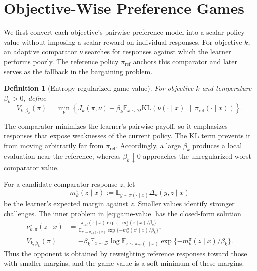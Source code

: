 \documentclass{article}
\newtheorem{definition}{Definition}
\theoremstyle{remark}
\theoremstyle{plain}
\newcommand{\KL}{\mathrm{KL}}
\newcommand{\E}{\mathbb{E}}
\newcommand{\D}{\mathcal{D}}
\newcommand{\piref}{\pi_{\mathrm{ref}}}
\begin{document}
\section{Objective-Wise Preference Games}
\label{sec:game-utility}
We first convert each objective's pairwise preference model into a scalar policy value without imposing a scalar reward on individual responses. For objective $k$, an adaptive comparator $\nu$ searches for responses against which the learner performs poorly. The reference policy $\piref$ anchors this comparator and later serves as the fallback in the bargaining problem.

\begin{definition}[Entropy-regularized game value]
\label{def:game-value}
For objective $k$ and temperature $\beta_k>0$, define
\begin{equation}
V_{k,\beta_k}(\pi)
=
\min_{\nu}
\left\{
J_k(\pi,\nu)
+
\beta_k\E_{x\sim\D}
\KL\!\left(\nu(\cdot\mid x)\,\|\,\piref(\cdot\mid x)\right)
\right\}.
\label{eq:game-value}
\end{equation}
\end{definition}
The comparator minimizes the learner's pairwise payoff, so it emphasizes responses that expose weaknesses of the current policy. The KL term prevents it from moving arbitrarily far from $\piref$. Accordingly, a large $\beta_k$ produces a local evaluation near the reference, whereas $\beta_k\downarrow0$ approaches the unregularized worst-comparator value.

For a candidate comparator response $z$, let
\begin{equation}
m_k^\pi(z\mid x)
:=
\E_{y\sim\pi(\cdot\mid x)}\Delta_k(y,z\mid x)
\label{eq:r-def}
\end{equation}
be the learner's expected margin against $z$. Smaller values identify stronger challenges. The inner problem in \eqref{eq:game-value} has the closed-form solution
\begin{align}
\nu^\star_{k,\pi}(z\mid x)
&=
\frac{
\piref(z\mid x)\exp\{-m_k^\pi(z\mid x)/\beta_k\}
}{
\E_{z'\sim\piref(\cdot\mid x)}
\exp\{-m_k^\pi(z'\mid x)/\beta_k\}
},
\label{eq:regularized-opponent}\\
V_{k,\beta_k}(\pi)
&=
-\beta_k\E_{x\sim\D}
\log
\E_{z\sim\piref(\cdot\mid x)}
\exp\{-m_k^\pi(z\mid x)/\beta_k\}.
\label{eq:soft-value}
\end{align}
Thus the opponent is obtained by reweighting reference responses toward those with smaller margins, and the game value is a soft minimum of these margins.
\end{document}
